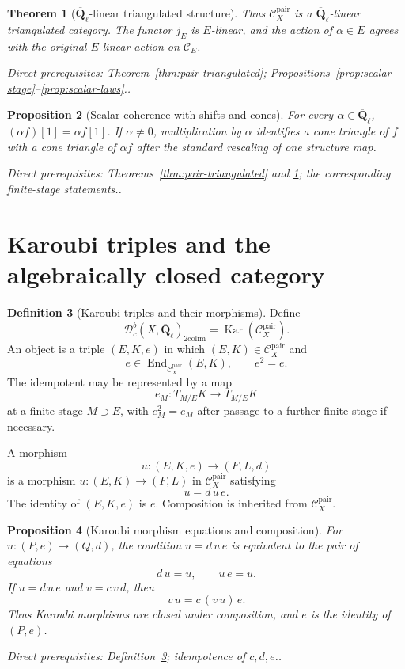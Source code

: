 \documentclass[10pt]{article}
\newtheorem{theorem}{Theorem}[section]
\newtheorem{proposition}[theorem]{Proposition}
\theoremstyle{definition}
\newtheorem{definition}[theorem]{Definition}
\newcommand{\Qlb}{\overline{\mathbf Q}_\ell}
\newcommand{\Dbc}{\mathcal D^b_c}
\newcommand{\Kar}{\operatorname{Kar}}
\newcommand{\Pair}{\mathcal C_X^{\mathrm{pair}}}
\newcommand{\depends}[1]{\par\smallskip\noindent\textit{Direct prerequisites:} #1.}
\begin{document}
\begin{theorem}[$\Qlb$-linear triangulated structure]
\label{thm:qbar-linear}
Thus $\Pair$ is a $\Qlb$-linear triangulated category.  The functor $j_E$
is $E$-linear, and the action of $\alpha\in E$ agrees with the original
$E$-linear action on $\mathcal C_E$.
\depends{Theorem~\ref{thm:pair-triangulated};
Propositions~\ref{prop:scalar-stage}--\ref{prop:scalar-laws}.}
\end{theorem}

\begin{proposition}[Scalar coherence with shifts and cones]
\label{prop:scalar-cones}
For every $\alpha\in\Qlb$,
$(\alpha f)[1]=\alpha f[1]$.  If $\alpha\neq0$, multiplication by $\alpha$
identifies a cone triangle of $f$ with a cone triangle of $\alpha f$ after
the standard rescaling of one structure map.
\depends{Theorems~\ref{thm:pair-triangulated} and
\ref{thm:qbar-linear}; the corresponding finite-stage statements.}
\end{proposition}

\section{Karoubi triples and the algebraically closed category}

\begin{definition}[Karoubi triples and their morphisms]
\label{def:karoubi-triples}
Define
\[
 \Dbc(X,\Qlb)_{\mathrm{2colim}}=\Kar(\Pair).
\]
An object is a triple $(E,K,e)$ in which $(E,K)\in\Pair$ and
\[
 e\in\operatorname{End}_{\Pair}(E,K),\qquad e^2=e.
\]
The idempotent may be represented by a map
\[
 e_M:T_{M/E}K\longrightarrow T_{M/E}K
\]
at a finite stage $M\supset E$, with $e_M^2=e_M$ after passage to a further
finite stage if necessary.

A morphism
\[
 u:(E,K,e)\longrightarrow(F,L,d)
\]
is a morphism $u:(E,K)\to(F,L)$ in $\Pair$ satisfying
\[
 u=d\,u\,e.
\]
The identity of $(E,K,e)$ is $e$.  Composition is inherited from $\Pair$.
\end{definition}

\begin{proposition}[Karoubi morphism equations and composition]
\label{prop:karoubi-composition}
For $u:(P,e)\to(Q,d)$, the condition $u=d\,u\,e$ is equivalent to the pair
of equations
\[
 d\,u=u,\qquad u\,e=u.
\]
If $u=d\,u\,e$ and $v=c\,v\,d$, then
\[
 v\,u=c\,(v\,u)\,e.
\]
Thus Karoubi morphisms are closed under composition, and $e$ is the identity
of $(P,e)$.
\depends{Definition~\ref{def:karoubi-triples}; idempotence of $c,d,e$.}
\end{proposition}
\end{document}
